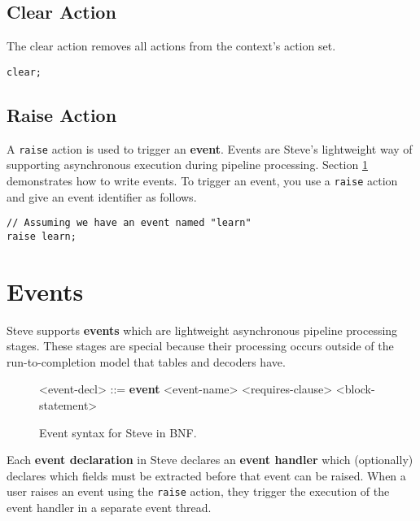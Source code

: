 \subsection{Clear Action} \label{clear_action_tut}

The clear action removes all actions from the context's action set.

\begin{lstlisting}
clear;
\end{lstlisting}

\subsection{Raise Action} \label{raise_action_tut}

A \texttt{raise} action is used to trigger an \textbf{event}. Events are Steve's lightweight way of supporting asynchronous execution during pipeline processing. Section \ref{event_tut} demonstrates how to write events. To trigger an event, you use a \texttt{raise} action and give an event identifier as follows.

\begin{lstlisting}
// Assuming we have an event named "learn"
raise learn;
\end{lstlisting}

\section{Events} \label{event_tut}

Steve supports \textbf{events} which are lightweight asynchronous pipeline processing stages. These stages are special because their processing occurs outside of the run-to-completion model that tables and decoders have. 

\begin{figure}[ht]
\begin{mdframed}
\begin{grammar}

<event-decl> ::=
\textbf{event} <event-name> <requires-clause> 
<block-statement>

\end{grammar}
\end{mdframed}
\caption{Event syntax for Steve in BNF.}
\label{fg:event_syntax}
\end{figure}

Each \textbf{event declaration} in Steve declares an \textbf{event handler} which (optionally) declares which fields must be extracted before that event can be raised. When a user raises an event using the \texttt{raise} action, they trigger the execution of the event handler in a separate event thread.

